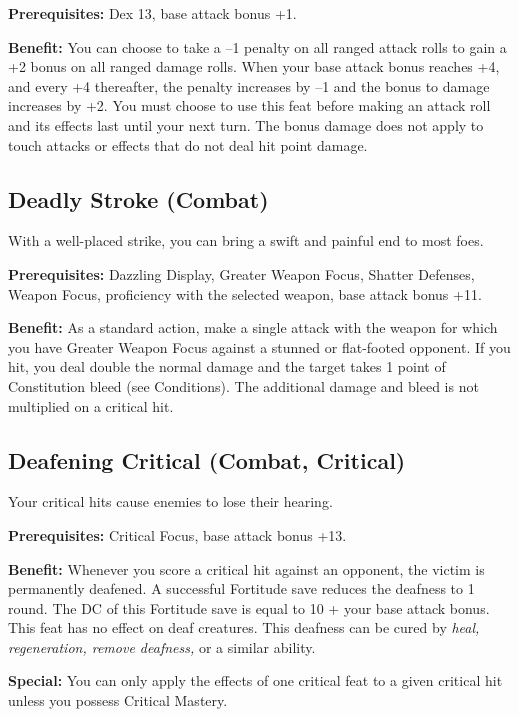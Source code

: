 \textbf{Prerequisites:} Dex 13, base attack bonus +1.
				
\textbf{Benefit:} You can choose to take a --1 penalty on all ranged attack rolls to gain a +2 bonus on all ranged damage rolls. When your base attack bonus reaches +4, and every +4 thereafter, the penalty increases by --1 and the bonus to damage increases by +2. You must choose to use this feat before making an attack roll and its effects last until your next turn. The bonus damage does not apply to touch attacks or effects that do not deal hit point damage.
				
\subsection{Deadly Stroke (Combat)}

				
With a well-placed strike, you can bring a swift and painful end to most foes.
				
\textbf{Prerequisites:} Dazzling Display, Greater Weapon Focus, Shatter Defenses, Weapon Focus, proficiency with the selected weapon, base attack bonus +11.
				
\textbf{Benefit:} As a standard action, make a single attack with the weapon for which you have Greater Weapon Focus against a stunned or flat-footed opponent. If you hit, you deal double the normal damage and the target takes 1 point of Constitution bleed (see Conditions). The additional damage and bleed is not multiplied on a critical hit.
				
\subsection{Deafening Critical (Combat, Critical)}

				
Your critical hits cause enemies to lose their hearing.
				
\textbf{Prerequisites:} Critical Focus, base attack bonus +13.
				
\textbf{Benefit:} Whenever you score a critical hit against an opponent, the victim is permanently deafened. A successful Fortitude save reduces the deafness to 1 round. The DC of this Fortitude save is equal to 10 + your base attack bonus. This feat has no effect on deaf creatures. This deafness can be cured by \textit{heal, regeneration, remove deafness, }or a similar ability.
				
\textbf{Special:} You can only apply the effects of one critical feat to a given critical hit unless you possess Critical Mastery.
				
